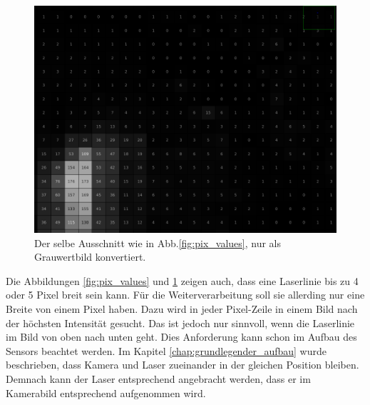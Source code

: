 	\begin{figure}[h]
		\centering
		\includegraphics[width=0.75\linewidth]{img/hauptteil/bildverarbeitung/pixel_values_gray.png}
		\caption[Pixel-Werte im Grauwertbild]{Der selbe Ausschnitt wie in Abb.\ref{fig:pix_values}, nur als Grauwertbild konvertiert.}
		\label{fig:pix_values_gray}
	\end{figure} 
	
	Die Abbildungen \ref{fig:pix_values} und \ref{fig:pix_values_gray} zeigen auch, dass eine Laserlinie bis zu 4 oder 5 Pixel breit sein kann. Für die Weiterverarbeitung soll sie allerding nur eine Breite von einem Pixel haben. Dazu wird in jeder Pixel-Zeile in einem Bild nach der höchsten Intensität gesucht. Das ist jedoch nur sinnvoll, wenn die Laserlinie im Bild von oben nach unten geht. Dies Anforderung kann schon im Aufbau des Sensors beachtet werden. Im Kapitel \ref{chap:grundlegender_aufbau} wurde beschrieben, dass Kamera und Laser zueinander in der gleichen Position bleiben. Demnach kann der Laser entsprechend angebracht werden, dass er im Kamerabild entsprechend aufgenommen wird.
	
